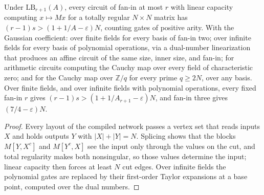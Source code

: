 \begin{theorem}
  \label{thm:lowerbounds-frontier-linear}
  \leanok
  Under $\mathrm{LB}_{r+1}(A)$, every circuit of fan-in at most $r$ with linear
  capacity computing $x\mapsto Mx$ for a totally regular $N\times N$ matrix has
  $(r-1)s>(1+1/A-\varepsilon)N$, counting gates of positive arity. With the
  Gaussian coefficient: over finite fields for every basis of fan-in two; over
  infinite fields for every basis of polynomial operations, via a dual-number
  linearization that produces an affine circuit of the same size, inner size, and
  fan-in; for arithmetic circuits computing the Cauchy map over every field of
  characteristic zero; and for the Cauchy map over $\mathbb{Z}/q$ for every prime
  $q\ge2N$, over any basis. Over finite fields, and over infinite fields with
  polynomial operations, every fixed fan-in $r$ gives
  $(r-1)s>(1+1/A_{r+1}-\varepsilon)N$, and fan-in three gives $(7/4-\varepsilon)N$.
\end{theorem}
\begin{proof}
  \leanok
  Every layout of the compiled network passes a vertex set that reads inputs $X$
  and holds outputs $Y$ with $|X|+|Y|=N$. Splicing shows that the blocks
  $M[Y,X^c]$ and $M[Y^c,X]$ see the input only through the values on the cut, and
  total regularity makes both nonsingular, so those values determine the input;
  linear capacity then forces at least $N$ cut edges. Over infinite fields the
  polynomial gates are replaced by their first-order Taylor expansions at a base
  point, computed over the dual numbers.
\end{proof}

